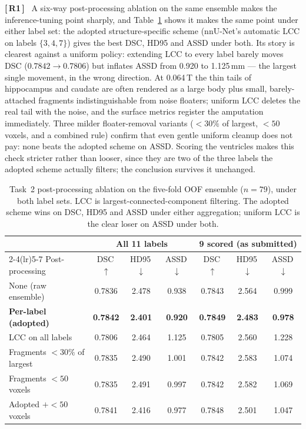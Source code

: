 \documentclass[runningheads]{llncs}
\newenvironment{revblock}[2]{\par\color{#1}\noindent\textbf{[\,#2\,]}\ \ignorespaces}{\par}
\begin{document}
\begin{revblock}{revone}{R1}
A six-way post-processing ablation on the same ensemble makes the inference-tuning
point sharply, and Table~\ref{tab:postproc} shows it makes the same point under either
label set: the adopted structure-specific scheme (nnU-Net's automatic LCC on labels
$\{3,4,7\}$) gives the best DSC, HD95 and ASSD under both. Its story is clearest
against a uniform policy: extending LCC to every label barely moves DSC
($0.7842\!\to\!0.7806$) but inflates ASSD from 0.920 to 1.125\,mm --- the largest
single movement, in the wrong direction. At 0.064\,T the thin
tails of hippocampus and caudate are often rendered as a large body plus small,
barely-attached fragments indistinguishable from noise floaters; uniform LCC deletes
the real tail with the noise, and the surface metrics register the amputation
immediately. Three milder floater-removal variants ($<30\%$ of largest, $<50$ voxels,
and a combined rule) confirm that even gentle uniform cleanup does not pay: none beats
the adopted scheme on ASSD. Scoring the ventricles makes this check stricter rather
than looser, since they are two of the three labels the adopted scheme actually
filters; the conclusion survives it unchanged.

\begin{table}[!htbp]
\caption{Task~2 post-processing ablation on the five-fold OOF ensemble ($n=79$), under
both label sets. LCC is largest-connected-component filtering. The adopted scheme wins
on DSC, HD95 and ASSD under either aggregation; uniform LCC is the clear loser on ASSD
under both.}
\label{tab:postproc}
\centering
\setlength{\tabcolsep}{3.5pt}
\footnotesize
\begin{tabular}{lcccccc}
\toprule
& \multicolumn{3}{c}{All 11 labels} & \multicolumn{3}{c}{9 scored (as submitted)} \\
\cmidrule(lr){2-4}\cmidrule(lr){5-7}
Post-processing & DSC\,$\uparrow$ & HD95\,$\downarrow$ & ASSD\,$\downarrow$
              & DSC\,$\uparrow$ & HD95\,$\downarrow$ & ASSD\,$\downarrow$ \\
\midrule
None (raw ensemble)            & 0.7836 & 2.478 & 0.938 & 0.7843 & 2.564 & 0.999 \\
\textbf{Per-label (adopted)}   & \textbf{0.7842} & \textbf{2.401} & \textbf{0.920}
  & \textbf{0.7849} & \textbf{2.483} & \textbf{0.978} \\
LCC on all labels              & 0.7806 & 2.464 & 1.125 & 0.7805 & 2.560 & 1.228 \\
Fragments $<30\%$ of largest   & 0.7835 & 2.490 & 1.001 & 0.7842 & 2.583 & 1.074 \\
Fragments $<50$ voxels         & 0.7835 & 2.491 & 0.997 & 0.7842 & 2.582 & 1.069 \\
Adopted $+<50$ voxels          & 0.7841 & 2.416 & 0.977 & 0.7848 & 2.501 & 1.047 \\
\bottomrule
\end{tabular}
\end{table}
\end{revblock}
\end{document}
